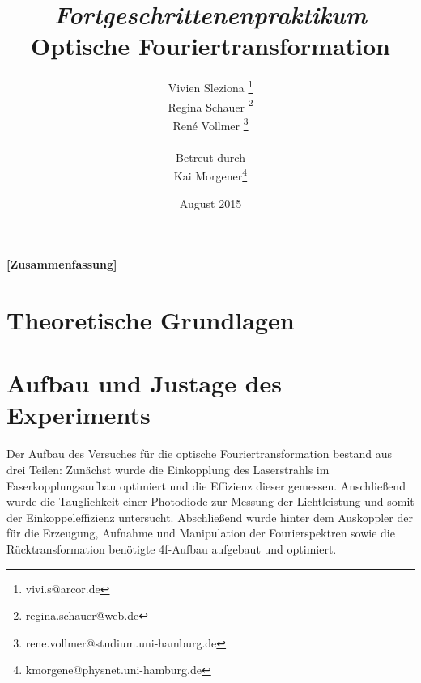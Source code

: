 \documentclass[12pt,a4paper]{article}
\begin{document}
	
	
	
	\title{\textit{Fortgeschrittenenpraktikum}\\\textbf{Optische Fouriertransformation} }
	\date{August 2015}
	\author{Vivien Sleziona \footnote{vivi.s@arcor.de}\\ Regina Schauer \footnote{regina.schauer@web.de}\\ René Vollmer \footnote{rene.vollmer@studium.uni-hamburg.de} \\ \\Betreut durch\\ Kai Morgener\footnote{kmorgene@physnet.uni-hamburg.de}}
	
	\maketitle
	
	\begin{center} 
		\bigskip
		\bigskip
		
		\begin{minipage}{0.75\textwidth}
			\textbf{[Zusammenfassung]}
			
		\end{minipage}
	\end{center}
	
	\newpage
	
	\tableofcontents
	\vfill
	\newpage
	\clearpage	
	
	
	\section{Theoretische Grundlagen}
	

	
	\newpage
	\clearpage
	\section{Aufbau und Justage des Experiments}
	Der Aufbau des Versuches für die optische Fouriertransformation bestand aus drei Teilen: Zunächst wurde die Einkopplung des Laserstrahls im Faserkopplungsaufbau optimiert und die Effizienz dieser gemessen. Anschließend wurde die Tauglichkeit einer Photodiode zur Messung der Lichtleistung und somit der Einkoppeleffizienz untersucht. Abschließend wurde hinter dem Auskoppler der für die Erzeugung, Aufnahme und Manipulation der Fourierspektren sowie die Rücktransformation benötigte 4f-Aufbau aufgebaut und optimiert.
	
\end{document}
